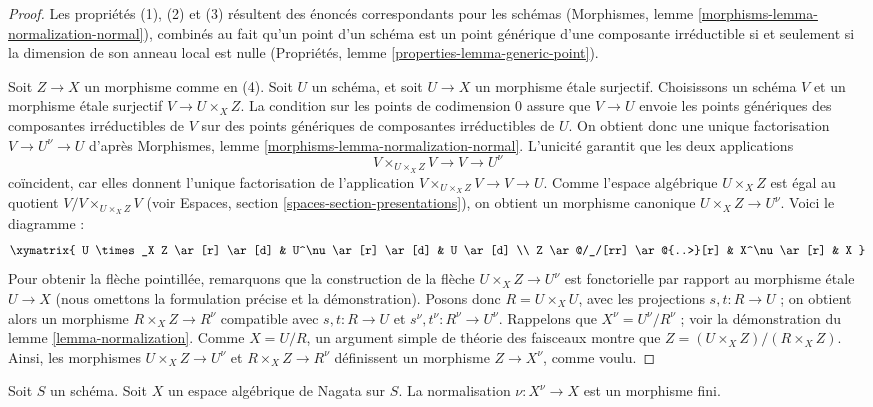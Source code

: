 \begin{proof}
Les propriétés (1), (2) et (3) résultent des énoncés correspondants
pour les schémas (Morphismes, lemme \ref{morphisms-lemma-normalization-normal}),
combinés au fait qu'un point d'un schéma est un point
générique d'une composante irréductible si et seulement si la dimension
de son anneau local est nulle
(Propriétés, lemme \ref{properties-lemma-generic-point}).

\medskip\noindent
Soit $Z \to X$ un morphisme comme en (4). Soit $U$ un schéma, et soit
$U \to X$ un morphisme étale surjectif. Choisissons un schéma $V$ et
un morphisme étale surjectif $V \to U \times_X Z$. La condition sur les
points de codimension $0$ assure que $V \to U$ envoie les points génériques des
composantes irréductibles de $V$ sur des points génériques de composantes
irréductibles de $U$. On obtient donc une unique factorisation
$V \to U^\nu \to U$ d'après
Morphismes, lemme \ref{morphisms-lemma-normalization-normal}.
L'unicité garantit que les deux applications
$$
V \times_{U \times_X Z} V \to V \to U^\nu
$$
coïncident, car elles donnent l'unique factorisation de l'application
$V \times_{U \times_X Z} V \to V \to U$.
Comme l'espace algébrique $U \times_X Z$ est égal au quotient
$V/V \times_{U \times_X Z} V$
(voir Espaces, section \ref{spaces-section-presentations}),
on obtient un morphisme canonique
$U \times_X Z \to U^\nu$. Voici le diagramme :
$$
\xymatrix{
U \times_X Z \ar[r] \ar[d] & U^\nu \ar[r] \ar[d] & U \ar[d] \\
Z \ar@/_/[rr] \ar@{..>}[r] & X^\nu \ar[r] & X
}
$$
Pour obtenir la flèche pointillée, remarquons que la construction de la
flèche $U \times_X Z \to U^\nu$ est fonctorielle par rapport au morphisme étale $U \to X$
(nous omettons la formulation précise et la démonstration).
Posons donc $R = U \times_X U$, avec les projections $s, t : R \to U$ ;
on obtient alors un morphisme $R \times_X Z \to R^\nu$ compatible avec
$s, t : R \to U$ et $s^\nu, t^\nu : R^\nu \to U^\nu$.
Rappelons que $X^\nu = U^\nu/R^\nu$ ; voir la démonstration du
lemme \ref{lemma-normalization}. Comme $X = U/R$, un argument simple
de théorie des faisceaux
montre que $Z = (U \times_X Z)/(R \times_X Z)$. Ainsi, les morphismes
$U \times_X Z \to U^\nu$ et $R \times_X Z \to R^\nu$ définissent un
morphisme $Z \to X^\nu$, comme voulu.
\end{proof}

\begin{lemma}
\label{lemma-nagata-normalization}
Soit $S$ un schéma. Soit $X$ un espace algébrique de Nagata sur $S$.
La normalisation $\nu : X^\nu \to X$ est un morphisme fini.
\end{lemma}

